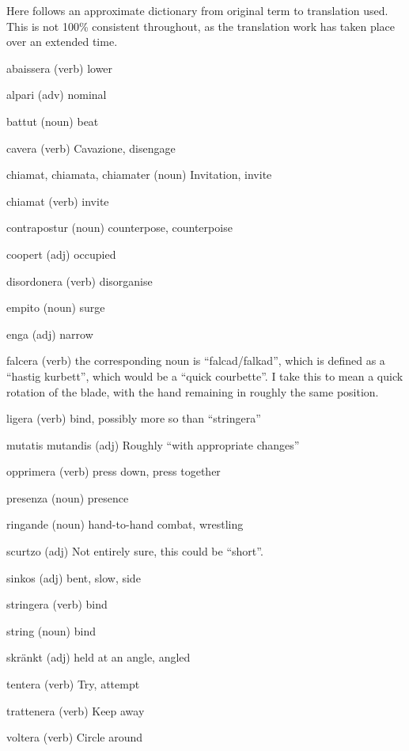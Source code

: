 \newpage
{}

Here follows an approximate dictionary from original term to translation used. This is not 100\% consistent throughout, as the translation work has taken place over an extended time.

\begin{description}
\item{abaissera} (verb) lower
\item{alpari} (adv) nominal
\item{battut} (noun) beat
\item{cavera} (verb) Cavazione, disengage
\item{chiamat, chiamata, chiamater} (noun) Invitation, invite
\item{chiamat} (verb) invite
\item{contrapostur} (noun) counterpose, counterpoise
\item{coopert} (adj) occupied
\item{disordonera} (verb) disorganise
\item{empito} (noun) surge
\item{enga} (adj) narrow
\item{falcera} (verb) the corresponding noun is ``falcad/falkad'', which is defined as a ``hastig kurbett'', which would be a ``quick courbette''. I take this to mean a quick rotation of the blade, with the hand remaining in roughly the same position.
\item{ligera} (verb) bind, possibly more so than ``stringera''
\item{mutatis mutandis} (adj) Roughly ``with appropriate changes''
\item{opprimera} (verb) press down, press together
\item{presenza} (noun) presence
\item{ringande} (noun) hand-to-hand combat, wrestling
\item{scurtzo} (adj) Not entirely sure, this could be ``short''.
\item{sinkos} (adj) bent, slow, side
\item{stringera} (verb) bind
\item{string} (noun) bind
\item{skränkt} (adj) held at an angle, angled
\item{tentera} (verb) Try, attempt
\item{trattenera} (verb) Keep away
\item{voltera} (verb) Circle around
\end{description}
